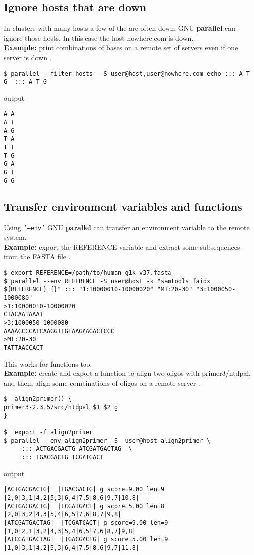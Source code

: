 \documentclass{article}
\newcommand{\example}[1]{
\textbf{Example: } {\color[rgb]{0,0,1} #1 } .
}
\newcommand{\cmdoption}[1]{\texttt{'#1'}}
\def\prl{\textbf{parallel}}
\begin{document}
\subsection{Ignore hosts that are down}
In clusters with many hosts a few of the are often down. GNU \prl{} can ignore those hosts. In this case the host nowhere.com is down.\\
\example{print combinations of bases on a remote set of servers even if one server is down}
\begin{lstlisting}
$ parallel --filter-hosts  -S user@host,user@nowhere.com echo ::: A T G  ::: A T G 
\end{lstlisting}
output
\begin{lstlisting}
A A
A T
A G
T A
T T
T G
G A
G T
G G
\end{lstlisting}

\subsection{Transfer environment variables and functions}
Using \cmdoption{--env} GNU \prl{} can transfer an environment variable to the remote system.\\
\example{export the REFERENCE variable and extract some subsequences from the FASTA file}
\begin{lstlisting}
$ export REFERENCE=/path/to/human_g1k_v37.fasta
$ parallel --env REFERENCE -S user@host -k "samtools faidx ${REFERENCE} {}" ::: "1:10000010-10000020" "MT:20-30" "3:1000050-1000080"
>1:10000010-10000020
CTACAATAAAT
>3:1000050-1000080
AAAAGCCCATCAAGGTTGTAAGAAGACTCCC
>MT:20-30
TATTAACCACT
\end{lstlisting}

This works for functions too.\\
\example{create and export a function to align two oligos with primer3/ntdpal, and then, align some combinations of oligos on a remote server}
\begin{lstlisting}
$  align2primer() {
primer3-2.3.5/src/ntdpal $1 $2 g
}

$  export -f align2primer
$ parallel --env align2primer -S  user@host align2primer \
	 ::: ACTGACGACTG ATCGATGACTAG  \
	 ::: TGACGACTG TCGATGACT
\end{lstlisting}
output
\begin{lstlisting}
|ACTGACGACTG|  |TGACGACTG| g score=9.00 len=9 |2,0|3,1|4,2|5,3|6,4|7,5|8,6|9,7|10,8|
|ACTGACGACTG|  |TCGATGACT| g score=5.00 len=8 |2,0|3,2|4,3|5,4|6,5|7,6|8,7|9,8|
|ATCGATGACTAG|  |TCGATGACT| g score=9.00 len=9 |1,0|2,1|3,2|4,3|5,4|6,5|7,6|8,7|9,8|
|ATCGATGACTAG|  |TGACGACTG| g score=5.00 len=9 |1,0|3,1|4,2|5,3|6,4|7,5|8,6|9,7|11,8|
\end{lstlisting}
\end{document}
